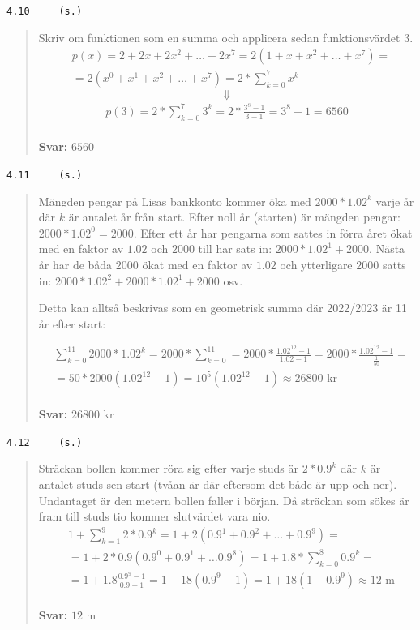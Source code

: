 \documentclass[a4paper]{article}
\newcommand{\tskcol}[1]{\textcolor{tskcol}{#1}}
\begin{document}
	\texttt{\tskcol{4.10~~~~ (s.)}}
	\begin{quotation}
		\noindent
		Skriv om funktionen som en summa och applicera sedan funktionsvärdet 3.
		\begin{align*}
		&p(x)=
		2+2x+2x^2+\ldots+2x^7=
		2(1+x+x^2+\ldots+x^7)= \\
		&=2(x^0+x^1+x^2+\ldots+x^7)=
		2*\sum_{k=0}^{7}x^k
		\end{align*}
		\[\Downarrow\]
		\begin{align*}
		p(3)=
		2*\sum_{k=0}^{7}3^k=
		2*\frac{3^8-1}{3-1}=
		3^8-1=
		6560
		\end{align*}
		\\
		\textbf{Svar:} $6560$
	\end{quotation}
	
	\pagebreak
	\texttt{\tskcol{4.11~~~~ (s.)}}
	\begin{quotation}
		\noindent
		Mängden pengar på Lisas bankkonto kommer öka med $2000*1.02^k$ varje år där $k$ är antalet år från start. Efter noll år (starten) är mängden pengar: $2000*1.02^0=2000$. Efter ett år har pengarna som sattes in förra året ökat med en faktor av $1.02$ och $2000$ till har sats in: $2000*1.02^1+2000$. Nästa år har de båda $2000$ ökat med en faktor av $1.02$ och ytterligare $2000$ satts in: $2000*1.02^2+2000*1.02^1+2000$ osv.
		
		Detta kan alltså beskrivas som en geometrisk summa där 2022/2023 är 11 år efter start:
		
		\begin{align*}
		&\sum_{k=0}^{11}2000*1.02^k=
		2000*\sum_{k=0}^{11}=
		2000*\frac{1.02^{12}-1}{1.02-1}=
		2000*\frac{1.02^{12}-1}{\frac{1}{50}}=\\
		&=50*2000(1.02^{12}-1)=
		10^5(1.02^{12}-1)\approx
		26800\text{ kr}
		\end{align*}
		\\
		\textbf{Svar:} $26800$ kr
	\end{quotation}
	
	\texttt{\tskcol{4.12~~~~ (s.)}}
	\begin{quotation}
		\noindent
		Sträckan bollen kommer röra sig efter varje studs är $2*0.9^k$ där $k$ är antalet studs sen start (tvåan är där eftersom det både är upp och ner). Undantaget är den metern bollen faller i början. Då sträckan som sökes är fram till studs tio kommer slutvärdet vara nio.
		\begin{align*}
		&1+\sum_{k=1}^{9}2*0.9^k=
		1+2(0.9^1+0.9^2+\ldots+0.9^9)= \\
		&=1+2*0.9(0.9^0+0.9^1+\ldots0.9^8)=
		1+1.8*\sum_{k=0}^{8}0.9^k=\\
		&=1+1.8\frac{0.9^9-1}{0.9-1}=
		1-18(0.9^9-1)=
		1+18(1-0.9^9)\approx
		12\text{ m}
		\end{align*}
		\\
		\textbf{Svar:} $12$ m
	\end{quotation}
	
\end{document}
